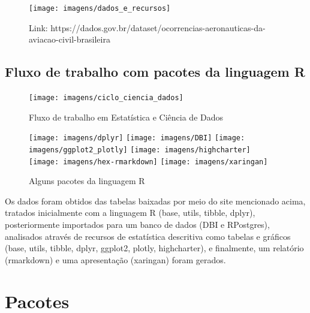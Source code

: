 \documentclass[
]{article}
\begin{document}
\begin{figure}

{\centering \texttt{[image: imagens/dados\_e\_recursos]} 

}

\caption{Link: https://dados.gov.br/dataset/ocorrencias-aeronauticas-da-aviacao-civil-brasileira}\label{fig:unnamed-chunk-3}
\end{figure}

\hypertarget{fluxo-de-trabalho-com-pacotes-da-linguagem-r}{%
\subsection{Fluxo de trabalho com pacotes da linguagem
R}\label{fluxo-de-trabalho-com-pacotes-da-linguagem-r}}

\begin{figure}

{\centering \texttt{[image: imagens/ciclo\_ciencia\_dados]} 

}

\caption{Fluxo de trabalho em Estatística e Ciência de Dados}\label{fig:unnamed-chunk-4}
\end{figure}

\begin{figure}

{\centering \texttt{[image: imagens/dplyr]} \texttt{[image: imagens/DBI]} \texttt{[image: imagens/ggplot2\_plotly]} \texttt{[image: imagens/highcharter]} \texttt{[image: imagens/hex-rmarkdown]} \texttt{[image: imagens/xaringan]} 

}

\caption{Alguns pacotes da linguagem R}\label{fig:unnamed-chunk-5}
\end{figure}

Os dados foram obtidos das tabelas baixadas por meio do site mencionado
acima, tratados inicialmente com a linguagem R (base, utils, tibble,
dplyr), posteriormente importados para um banco de dados (DBI e
RPostgres), analisados através de recursos de estatística descritiva
como tabelas e gráficos (base, utils, tibble, dplyr, ggplot2, plotly,
highcharter), e finalmente, um relatório (rmarkdown) e uma apresentação
(xaringan) foram gerados.

\newpage

\hypertarget{pacotes}{%
\section{Pacotes}\label{pacotes}}
\end{document}
